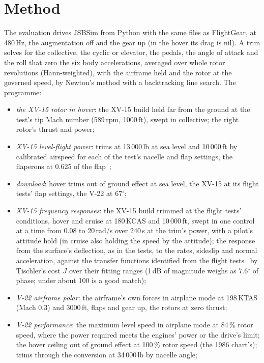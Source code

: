 \documentclass[10pt,a4paper,twocolumn]{article}
\begin{document}
\section{Method}\label{sec:method}
The evaluation drives JSBSim from Python with the same files as FlightGear, at 480\,Hz, the augmentation off and the gear up (in the
hover its drag is nil). A trim solves for the collective, the cyclic or elevator, the pedals, the angle of attack and the roll that zero
the six body accelerations, averaged over whole rotor revolutions (Hann-weighted), with the airframe held and the rotor at the governed
speed, by Newton's method with a backtracking line search. The programme:
\begin{itemize}
\item \emph{the XV-15 rotor in hover}: the XV-15 build held far from the ground at the test's tip Mach number (589\,rpm, 1000\,ft), swept
in collective; the right rotor's thrust and power;
\item \emph{XV-15 level-flight power}: trims at 13\,000\,lb at sea level and 10\,000\,ft by calibrated airspeed for each of the test's nacelle
and flap settings, the flaperons at 0.625 of the flap~\cite{tx};
\item \emph{download}: hover trims out of ground effect at sea level, the XV-15 at its flight tests' flap settings, the V-22 at 67$^\circ$;
\item \emph{XV-15 frequency responses}: the XV-15 build trimmed at the flight tests' conditions, hover and cruise at 180\,KCAS and 10\,000\,ft, swept in
one control at a time from 0.08 to 20\,rad/s over 240\,s at the trim's power, with a pilot's attitude hold (in cruise also holding the speed by the attitude);
the response from the surface's deflection, as in the tests, to the rates, sideslip and normal acceleration, against the transfer functions identified from the
flight tests~\cite{tt} by Tischler's cost $J$ over their fitting ranges (1\,dB of magnitude weighs as 7.6$^\circ$ of phase; under about 100 is a good match);
\item \emph{V-22 airframe polar}: the airframe's own forces in airplane mode at 198\,KTAS (Mach 0.3) and 3000\,ft, flaps and gear up, the rotors at zero thrust;
\item \emph{V-22 performance}: the maximum level speed in airplane mode at 84\,\% rotor speed, where the power required meets the engines'
power or the drive's limit; the hover ceiling out of ground effect at 100\,\% rotor speed (the 1986 chart's); trims through the conversion
at 34\,000\,lb by nacelle angle;

\end{itemize}
\end{document}
